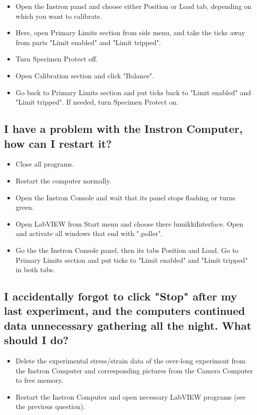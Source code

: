 \documentclass[a4paper]{article}
\begin{document}
\begin{itemize}  
  \item Open the Instron panel and choose either Position or Load tab, depending on which you want to calibrate.
  \item Here, open Primary Limits section from side menu, and take the ticks away from parts "Limit enabled" and "Limit tripped".
  \item Turn Specimen Protect off.
  \item Open Calibration section and click "Balance".
  \item Go back to Primary Limits section and put ticks back to "Limit enabled" and "Limit tripped". If needed, turn Specimen Protect on.
\end{itemize}

\subsection{I have a problem with the Instron Computer, how can I restart it?}

\begin{itemize}  
  \item Close all programs.
  \item Restart the computer normally.
  \item Open the Instron Console and wait that its panel stops flashing or turns green.
  \item Open LabVIEW from Start menu and choose there lumikkiInterface. Open and activate all windows that end with ".poller".
  \item Go the the Instron Console panel, then its tabs Position and Load. Go to Primary Limits section and put ticks to "Limit enabled" and "Limit tripped" in both tabs.
\end{itemize}

\subsection{I accidentally forgot to click "Stop" after my last experiment, and the computers continued data unnecessary gathering all the night. What should I do?}

\begin{itemize}  
  \item Delete the experimental stress/strain data of the over-long experiment from the Instron Computer and corresponding pictures from the Camera Computer to free memory.
  \item Restart the Instron Computer and open necessary LabVIEW programs (see the previous question).
\end{itemize}
\end{document}

